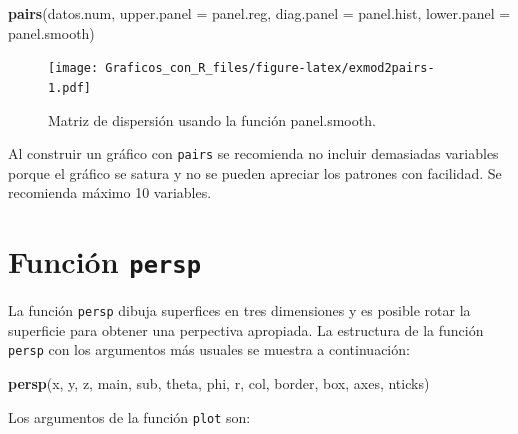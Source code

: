 \documentclass[10pt,]{krantz}
\makeatletter
\newenvironment{Shaded}{\begin{snugshade}}{\end{snugshade}}
\newcommand{\KeywordTok}[1]{\textcolor[rgb]{0.13,0.29,0.53}{\textbf{#1}}}
\newcommand{\DataTypeTok}[1]{\textcolor[rgb]{0.13,0.29,0.53}{#1}}
\newcommand{\NormalTok}[1]{#1}
\newenvironment{kframe}{%
\medskip{}
\setlength{\fboxsep}{.8em}
 \def\at@end@of@kframe{}%
 \ifinner\ifhmode%
  \def\at@end@of@kframe{\end{minipage}}%
  \begin{minipage}{\columnwidth}%
 \fi\fi%
 \def\FrameCommand##1{\hskip\@totalleftmargin \hskip-\fboxsep
 \colorbox{shadecolor}{##1}\hskip-\fboxsep
     \hskip-\linewidth \hskip-\@totalleftmargin \hskip\columnwidth}%
 \MakeFramed {\advance\hsize-\width
   \@totalleftmargin\z@ \linewidth\hsize
   \@setminipage}}%
 {\par\unskip\endMakeFramed%
 \at@end@of@kframe}
\renewenvironment{Shaded}{\begin{kframe}}{\end{kframe}}
\let\BeginKnitrBlock\begin \let\EndKnitrBlock\end
\makeatother
\begin{document}
\begin{Shaded}
\begin{Highlighting}[]
\KeywordTok{pairs}\NormalTok{(datos.num,}
      \DataTypeTok{upper.panel =}\NormalTok{ panel.reg,}
      \DataTypeTok{diag.panel =}\NormalTok{ panel.hist,}
      \DataTypeTok{lower.panel =}\NormalTok{ panel.smooth)}
\end{Highlighting}
\end{Shaded}

\begin{figure}
\centering
\texttt{[image: Graficos\_con\_R\_files/figure-latex/exmod2pairs-1.pdf]}
\caption{\label{fig:exmod2pairs}Matriz de dispersión usando la función
panel.smooth.}
\end{figure}

\BeginKnitrBlock{rmdtip}
Al construir un gráfico con \texttt{pairs} se recomienda no incluir
demasiadas variables porque el gráfico se satura y no se pueden apreciar
los patrones con facilidad. Se recomienda máximo 10 variables.
\EndKnitrBlock{rmdtip}

\section{\texorpdfstring{Función \texttt{persp}
}{Función persp }}\label{funcion-persp}

La función \texttt{persp} dibuja superfices en tres dimensiones y es
posible rotar la superficie para obtener una perpectiva apropiada. La
estructura de la función \texttt{persp} con los argumentos más usuales
se muestra a continuación:

\begin{Shaded}
\begin{Highlighting}[]
\KeywordTok{persp}\NormalTok{(x, y, z, main, sub, theta, phi, r, col,}
\NormalTok{      border, box, axes, nticks)}
\end{Highlighting}
\end{Shaded}

Los argumentos de la función \texttt{plot} son:
\end{document}

